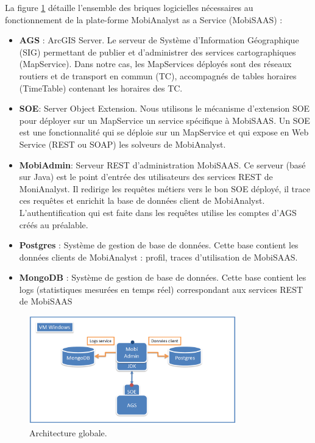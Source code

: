 \begin{itemize}
La figure \ref{fig:architecture} détaille l'ensemble des briques logicielles nécessaires au fonctionnement de la plate-forme
MobiAnalyst as a Service (MobiSAAS) :
\begin{itemize}
\item \textbf{AGS} : ArcGIS Server. Le serveur de Système d'Information Géographique (SIG) permettant de publier et d'administrer des services cartographiques (MapService).
      Dans notre cas, les MapServices déployés sont des réseaux routiers et de transport en commun (TC),
			accompagnés de tables horaires (TimeTable) contenant les horaires
			des TC.
\item \textbf{SOE}: Server Object Extension. Nous utilisons le mécanisme d'extension SOE pour déployer sur un MapService un service spécifique à MobiSAAS. Un SOE est
      une fonctionnalité qui se déploie sur un MapService et qui expose en Web Service (REST ou SOAP) les solveurs de MobiAnalyst.
\item \textbf{MobiAdmin}: Serveur REST d'administration MobiSAAS. Ce serveur (basé sur Java) est le point d'entrée des utilisateurs des services REST de MoniAnalyst.
      Il redirige les requêtes métiers vers le bon SOE déployé, il trace ces requêtes et enrichit la base de données client de MobiAnalyst.
			L'authentification qui est faite dans les requêtes utilise les comptes d'AGS créés au préalable.
\item \textbf{Postgres} : Système de gestion de base de données. Cette base contient les données clients de MobiAnalyst : profil, traces d'utilisation de MobiSAAS.
\item \textbf{MongoDB} : Système de gestion de base de données. Cette base contient les logs (statistiques mesurées en temps réel) correspondant aux services REST de MobiSAAS
\end{itemize}

\begin{figure}[h]
	\centering
		\includegraphics[width=0.8\textwidth]{images/architecture.png}
	\caption{Architecture globale.}
	\label{fig:architecture}
\end{figure}


\end{itemize}
